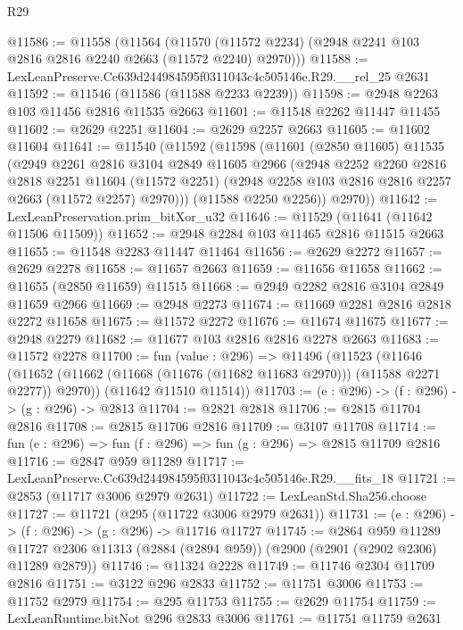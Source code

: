 \begin{lexlean}{R29}
\begin{coremodule}
@11586 := @11558
    (@11564 (@11570 (@11572 @2234) (@2948 @2241 @103 @2816 @2816 @2240 @2663 (@11572 @2240) @2970)))
@11588 := LexLeanPreserve.Cc639d244984595f0311043c4c505146e.R29.__rel_25 @2631
@11592 := @11546 (@11586 (@11588 @2233 @2239))
@11598 := @2948 @2263 @103 @11456 @2816 @11535 @2663
@11601 := @11548 @2262 @11447 @11455
@11602 := @2629 @2251
@11604 := @2629 @2257 @2663
@11605 := @11602 @11604
@11641 := @11540
    (@11592
      (@11598
        (@11601
          (@2850 @11605)
          @11535
          (@2949
            @2261
            @2816
            @3104
            @2849
            @11605
            @2966
            (@2948
              @2252
              @2260
              @2816
              @2818
              @2251
              @11604
              (@11572 @2251)
              (@2948 @2258 @103 @2816 @2816 @2257 @2663 (@11572 @2257) @2970)))
          (@11588 @2250 @2256))
        @2970))
@11642 := LexLeanPreservation.prim_bitXor_u32
@11646 := @11529 (@11641 (@11642 @11506 @11509))
@11652 := @2948 @2284 @103 @11465 @2816 @11515 @2663
@11655 := @11548 @2283 @11447 @11464
@11656 := @2629 @2272
@11657 := @2629 @2278
@11658 := @11657 @2663
@11659 := @11656 @11658
@11662 := @11655 (@2850 @11659) @11515
@11668 := @2949 @2282 @2816 @3104 @2849 @11659 @2966
@11669 := @2948 @2273
@11674 := @11669 @2281 @2816 @2818 @2272 @11658
@11675 := @11572 @2272
@11676 := @11674 @11675
@11677 := @2948 @2279
@11682 := @11677 @103 @2816 @2816 @2278 @2663
@11683 := @11572 @2278
@11700 := fun (value : @296) =>
  @11496
    (@11523
      (@11646 (@11652 (@11662 (@11668 (@11676 (@11682 @11683 @2970))) (@11588 @2271 @2277)) @2970))
      (@11642 @11510 @11514))
@11703 := (e : @296) -> (f : @296) -> (g : @296) -> @2813
@11704 := @2821 @2818
@11706 := @2815 @11704 @2816
@11708 := @2815 @11706 @2816
@11709 := @3107 @11708
@11714 := fun (e : @296) => fun (f : @296) => fun (g : @296) => @2815 @11709 @2816
@11716 := @2847 @959 @11289
@11717 := LexLeanPreserve.Cc639d244984595f0311043c4c505146e.R29.__fits_18
@11721 := @2853 (@11717 @3006 @2979 @2631)
@11722 := LexLeanStd.Sha256.choose
@11727 := @11721 (@295 (@11722 @3006 @2979 @2631))
@11731 := (e : @296) -> (f : @296) -> (g : @296) -> @11716 @11727
@11745 := @2864
    @959
    @11289
    @11727
    @2306
    @11313
    (@2884 (@2894 @959))
    (@2900 (@2901 (@2902 @2306) @11289 @2879))
@11746 := @11324 @2228
@11749 := @11746 @2304 @11709 @2816
@11751 := @3122 @296 @2833
@11752 := @11751 @3006
@11753 := @11752 @2979
@11754 := @295 @11753
@11755 := @2629 @11754
@11759 := LexLeanRuntime.bitNot @296 @2833 @3006
@11761 := @11751 @11759 @2631

\end{coremodule}
\end{lexlean}
